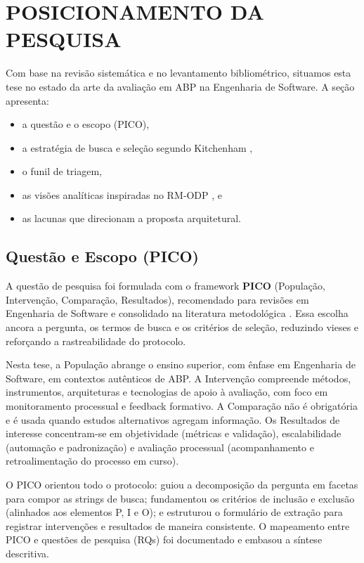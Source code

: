 \documentclass[12pt,a4paper]{article}
\begin{document}
\section{POSICIONAMENTO DA PESQUISA}

Com base na revisão sistemática e no levantamento bibliométrico, situamos esta tese no estado da arte da avaliação em ABP na Engenharia de Software. A seção apresenta:
\begin{itemize}
  \item a questão e o escopo (PICO),
  \item a estratégia de busca e seleção segundo Kitchenham \cite{kitchenham2004},
  \item o funil de triagem,
  \item as visões analíticas inspiradas no RM‑ODP \cite{iso10746}, e
  \item as lacunas que direcionam a proposta arquitetural.
\end{itemize}

\subsection{Questão e Escopo (PICO)}

A questão de pesquisa foi formulada com o framework \textbf{PICO} (População, Intervenção, Comparação, Resultados), recomendado para revisões em Engenharia de Software \cite{kitchenham2004} e consolidado na literatura metodológica \cite{santos2007pico}. Essa escolha ancora a pergunta, os termos de busca e os critérios de seleção, reduzindo vieses e reforçando a rastreabilidade do protocolo.

Nesta tese, a População abrange o ensino superior, com ênfase em Engenharia de Software, em contextos autênticos de ABP. A Intervenção compreende métodos, instrumentos, arquiteturas e tecnologias de apoio à avaliação, com foco em monitoramento processual e feedback formativo. A Comparação não é obrigatória e é usada quando estudos alternativos agregam informação. Os Resultados de interesse concentram-se em objetividade (métricas e validação), escalabilidade (automação e padronização) e avaliação processual (acompanhamento e retroalimentação do processo em curso).

O PICO orientou todo o protocolo: guiou a decomposição da pergunta em facetas para compor as strings de busca; fundamentou os critérios de inclusão e exclusão (alinhados aos elementos P, I e O); e estruturou o formulário de extração para registrar intervenções e resultados de maneira consistente. O mapeamento entre PICO e questões de pesquisa (RQs) foi documentado e embasou a síntese descritiva.
\end{document}
